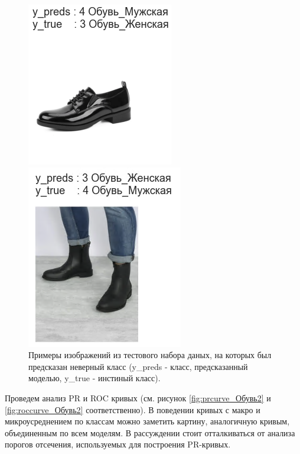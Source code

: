 \documentclass[a4paper,12pt]{extarticle}
\begin{document}
\begin{figure}[ht]
\begin{minipage}[b]{1.1in}
	\end{minipage}
	\hfill
	\begin{minipage}[b]{0.8in}
		\includegraphics[scale=0.4]{classification/classification_errorshoes4.png}
	\end{minipage}
	\hfill
	\begin{minipage}[b]{1in}
		\includegraphics[scale=0.4]{classification/classification_errorshoes5.png}
	\end{minipage}
	\caption{Примеры изображений из тестового набора даных, на которых был предсказан неверный класс (y\_preds - класс, предсказанный моделью, y\_true - инстиный класс).}
	\label{fig:classification_errorshoes}
\end{figure}

Проведем анализ PR и ROC кривых (см. рисунок \ref{fig:prcurve_Обувь2} и \ref{fig:roccurve_Обувь2} соответственно). В поведении кривых с макро и микроусреднением по классам можно заметить картину, аналогичную кривым, объединенным по всем моделям. В рассуждении стоит отталкиваться от анализа порогов отсечения, используемых для построения PR-кривых.
\end{document}

